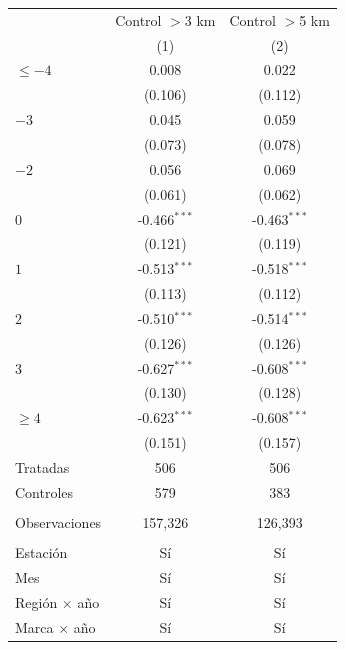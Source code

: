 
\begingroup
\centering
\begin{tabular}{lcc}
   \toprule
                        & Control $>$3 km & Control $>$5 km \\   
                        & (1)             & (2)\\  
   \midrule 
   $\leq -4$            & 0.008           & 0.022\\   
                        & (0.106)         & (0.112)\\   
   $-3$                 & 0.045           & 0.059\\   
                        & (0.073)         & (0.078)\\   
   $-2$                 & 0.056           & 0.069\\   
                        & (0.061)         & (0.062)\\   
   $0$                  & -0.466$^{***}$  & -0.463$^{***}$\\   
                        & (0.121)         & (0.119)\\   
   $1$                  & -0.513$^{***}$  & -0.518$^{***}$\\   
                        & (0.113)         & (0.112)\\   
   $2$                  & -0.510$^{***}$  & -0.514$^{***}$\\   
                        & (0.126)         & (0.126)\\   
   $3$                  & -0.627$^{***}$  & -0.608$^{***}$\\   
                        & (0.130)         & (0.128)\\   
   $\geq 4$             & -0.623$^{***}$  & -0.608$^{***}$\\   
                        & (0.151)         & (0.157)\\   
   Tratadas             & 506             & 506\\  
   Controles            & 579             & 383\\  
    \\
   Observaciones        & 157,326         & 126,393\\  
    \\
   Estación             & Sí              & Sí\\  
   Mes                  & Sí              & Sí\\  
   Región $\times$ año  & Sí              & Sí\\  
   Marca $\times$ año   & Sí              & Sí\\  
   \bottomrule
\end{tabular}
\par\endgroup


